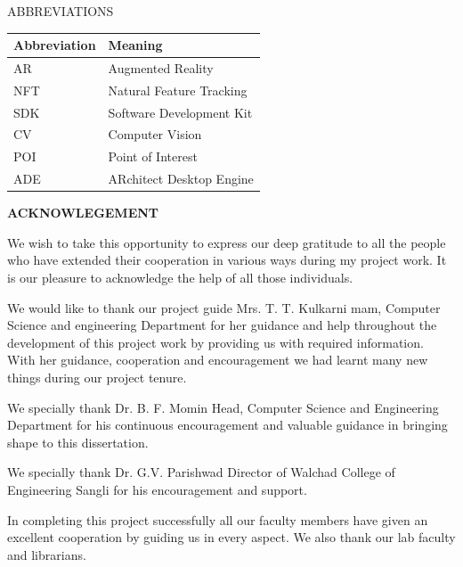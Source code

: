 \documentclass{article}
\begin{document}




\newpage
{
\tableofcontents
}
\newpage
\listoffigures



\newpage
\begin{center}
	\LARGE ABBREVIATIONS\\[1cm]
\end{center}

\renewcommand\arraystretch{1.3}
\renewcommand\tabcolsep{1cm}


\begin{tabular}{| l | l |}
	\hline
	Abbreviation & Meaning\\
	\hline
	AR & Augmented Reality\\
	NFT & Natural Feature Tracking\\
	SDK & Software Development Kit\\
	CV & Computer Vision\\
	POI & Point of Interest\\
	ADE & ARchitect Desktop Engine\\
	\hline
\end{tabular}





\newpage
\setlength{\parskip}{.2cm}
\begin{center}
{\LARGE \textbf{ ACKNOWLEGEMENT}}\\[1cm]
\end{center}
{\Large
	\par We wish to take this opportunity to express our deep gratitude to all the people who have 
extended their cooperation in various ways during my project work. It is our pleasure to acknowledge 
the help of all those individuals. 
	\par We would like to thank our project guide Mrs. T. T. Kulkarni mam, Computer Science and 
engineering Department for her guidance and help throughout the development of this project work 
by providing us with required information. With her guidance, cooperation and encouragement we 
had learnt many new things during our project tenure. 
	\par We specially thank Dr. B. F. Momin Head, Computer Science and Engineering Department for 
his continuous encouragement and valuable guidance in bringing shape to this dissertation. 
	\par  We specially thank Dr. G.V. Parishwad Director of Walchad College of Engineering Sangli for 
his encouragement and support.  
	\par In completing this project successfully all our faculty members have given an excellent 
cooperation by guiding us in every aspect. We also thank our lab faculty and librarians.
}\\[1cm]
\vfill
\end{document}
